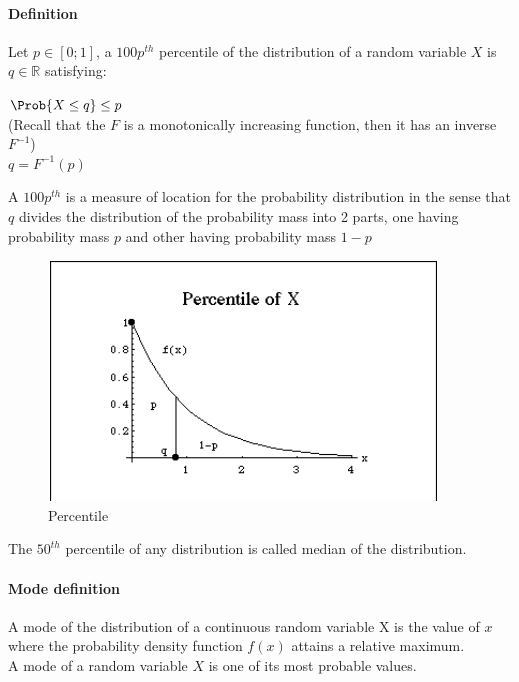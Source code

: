 \paragraph{Definition}
Let $p\in [0;1]$, a $100p^{th}$ percentile of the distribution of a random
variable $X$ is $q\in\mathbb{R}$ satisfying:
\begin{center}
	$\Prob{X\leq q}\leq p$\\
	(Recall that the $F$ is a monotonically increasing function, then it has an 
	inverse $F^{-1}$)\\
	$q = F^{-1}(p)$
\end{center}
A $100p^{th}$ is a measure of location for the probability distribution in
the sense that $q$ divides the distribution of the probability mass into
2 parts, one having probability mass $p$ and other having probability mass
$1-p$
\begin{figure}[H]
	\begin{center}
		\includegraphics[width=.5\textwidth]{./chaps/12sec/images/1percentile.png}
	\end{center}
	\caption{Percentile}
	\label{fig:fig2.1}
\end{figure}
The $50^{th}$ percentile of any distribution is called median of the 
distribution.
\paragraph{Mode definition}
A mode of the distribution of a continuous random variable X is the value
of $x$ where the probability density function $f(x)$ attains a relative 
maximum.\\A mode of a random variable $X$ is one of its most probable
values.
